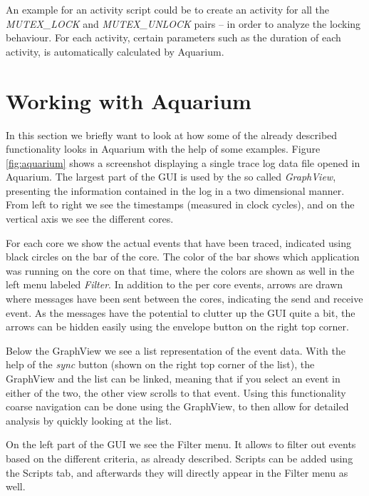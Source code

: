 \documentclass[a4paper,11pt,twoside]{report}
\begin{document}
An example for an activity script could be to create an activity for  all the
\emph{MUTEX\_LOCK} and \emph{MUTEX\_UNLOCK} pairs -- in order to analyze the
locking behaviour. For each activity, certain parameters such as the duration of
each activity, is automatically calculated by Aquarium.

\section{Working with Aquarium}

In this section we briefly want to look at how some of the already described
functionality looks in Aquarium with the help of some examples. Figure
\ref{fig:aquarium} shows a screenshot displaying a single trace log data file opened in
Aquarium. The largest part of the GUI is used by the so called \emph{GraphView},
presenting the information contained in the log in a two dimensional manner.
From left to right we see the timestamps (measured in clock cycles), and on the
vertical axis we see the different cores.

For each core we show the actual events that have been traced, indicated using
black circles on the bar of the core. The color of the bar shows which
application was running on the core on that time, where the colors are shown as
well in the left menu labeled \emph{Filter}. In addition to the per core events,
arrows are drawn where messages have been sent between the cores, indicating
the send and receive event. As the messages have the potential to clutter up the
GUI quite a bit, the arrows can be hidden easily using the envelope button on
the right top corner.

Below the GraphView we see a list representation of the event data. With the
help of the \emph{sync} button (shown on the right top corner of the list), the
GraphView and the list can be linked, meaning that if you select an event in
either of the two, the other view scrolls to that event. Using this
functionality coarse navigation can be done using the GraphView, to then allow
for detailed analysis by quickly looking at the list.

On the left part of the GUI we see the Filter menu. It allows to filter out
events based on the different criteria, as already described. Scripts can be
added using the Scripts tab, and afterwards they will directly appear in the
Filter menu as well.
\end{document}
